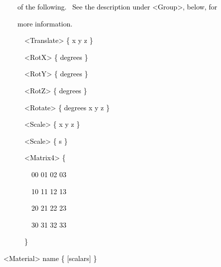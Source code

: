 \documentclass[a4paper]{article}
\newcommand\textstyleOOoComputerKeyWord[1]{\textrm{\textcolor[rgb]{0.0,0.0,0.5019608}{#1}}}
\begin{document}
{\color{black}
\textstyleOOoComputerKeyWord{\textcolor{black}{\ \ \ \ of the following. \ See the description under
{\textless}Group{\textgreater}, below, for}}}

{\color{black}
\textstyleOOoComputerKeyWord{\textcolor{black}{\ \ \ \ more information.}}}

\clearpage
\bigskip


\bigskip

{\color{black}
\textstyleOOoComputerKeyWord{\textcolor{black}{\ \ \ \ \ \ {\textless}Translate{\textgreater} \{ x y z \}}}}

{\color{black}
\textstyleOOoComputerKeyWord{\textcolor{black}{\ \ \ \ \ \ {\textless}RotX{\textgreater} \{ degrees \}}}}

{\color{black}
\textstyleOOoComputerKeyWord{\textcolor{black}{\ \ \ \ \ \ {\textless}RotY{\textgreater} \{ degrees \}}}}

{\color{black}
\textstyleOOoComputerKeyWord{\textcolor{black}{\ \ \ \ \ \ {\textless}RotZ{\textgreater} \{ degrees \}}}}

{\color{black}
\textstyleOOoComputerKeyWord{\textcolor{black}{\ \ \ \ \ \ {\textless}Rotate{\textgreater} \{ degrees x y z \}}}}

{\color{black}
\textstyleOOoComputerKeyWord{\textcolor{black}{\ \ \ \ \ \ {\textless}Scale{\textgreater} \{ x y z \}}}}

{\color{black}
\textstyleOOoComputerKeyWord{\textcolor{black}{\ \ \ \ \ \ {\textless}Scale{\textgreater} \{ s \}}}}


\bigskip

{\color{black}
\textstyleOOoComputerKeyWord{\textcolor{black}{\ \ \ \ \ \ {\textless}Matrix4{\textgreater} \{}}}

{\color{black}
\textstyleOOoComputerKeyWord{\textcolor{black}{\ \ \ \ \ \ \ \ 00 01 02 03}}}

{\color{black}
\textstyleOOoComputerKeyWord{\textcolor{black}{\ \ \ \ \ \ \ \ 10 11 12 13}}}

{\color{black}
\textstyleOOoComputerKeyWord{\textcolor{black}{\ \ \ \ \ \ \ \ 20 21 22 23}}}

{\color{black}
\textstyleOOoComputerKeyWord{\textcolor{black}{\ \ \ \ \ \ \ \ 30 31 32 33}}}

{\color{black}
\textstyleOOoComputerKeyWord{\textcolor{black}{\ \ \ \ \ \ \}}}}


\bigskip


\bigskip

{\color{black}
\textstyleOOoComputerKeyWord{\textcolor{black}{{\textless}Material{\textgreater} name \{ [scalars] \}}}}
\end{document}
